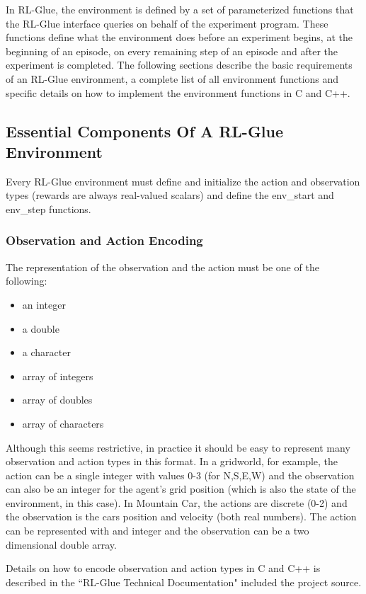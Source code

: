 \documentclass[11pt]{article}
\begin{document}
In RL-Glue, the environment is defined by a set of parameterized functions that the RL-Glue interface queries on behalf of the experiment program. These functions define what the environment does before an experiment begins, at the beginning of an episode, on every remaining step of an episode and after the experiment is completed. The following sections describe the basic requirements of an RL-Glue environment, a complete list of all environment functions and specific details on how to implement the environment functions in C and C++.


\subsection{Essential Components Of A RL-Glue Environment}
\label{envp1}

Every RL-Glue environment must define and initialize the action and observation types (rewards are always real-valued scalars) and define the env\_start and env\_step functions.   

\subsubsection{Observation and Action Encoding}
The representation of the observation and the action must be one of the following: 
\begin{itemize}
\item an integer
\item a double
\item a character
\item array of integers
\item array of doubles
\item array of characters
\end{itemize}
Although this seems restrictive, in practice it should be easy to represent many observation and action types in this format. In a gridworld, for example, the action can be a single integer with values 0-3 (for N,S,E,W) and the observation can also be an integer for the agent's grid position (which is also the state of the environment, in this case). In Mountain Car, the actions are discrete (0-2) and the observation is the cars position and velocity (both real numbers). The action can be represented with and integer and the observation can be a two dimensional double array. 


Details on how to encode observation and action types in C and C++ is described in the ``RL-Glue Technical Documentation" included the project source.
\end{document}
